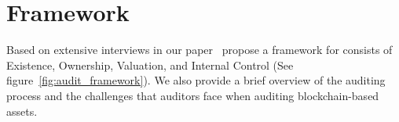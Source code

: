 

\section{Framework} \label{sec:auditing:framework} 
 Based on extensive interviews in our paper~\cite{} propose a framework for  consists of Existence, Ownership, Valuation, and Internal Control (See figure~\ref{fig:audit_framework}). We also provide a brief overview of the auditing process and the challenges that auditors face when auditing blockchain-based assets.


